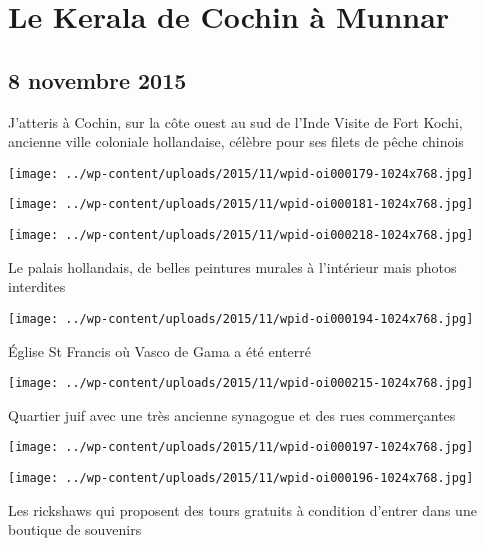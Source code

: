 \chapter{Le Kerala de Cochin à Munnar}
\section*{8 novembre 2015}
J'atteris à Cochin, sur la côte ouest au sud de l'Inde \newline
 Visite de Fort Kochi, ancienne ville coloniale hollandaise, célèbre pour ses filets de pêche chinois \newline
 \newline
\centerline{\texttt{[image: ../wp-content/uploads/2015/11/wpid-oi000179-1024x768.jpg]} } 
 \newline
 \newline
\centerline{\texttt{[image: ../wp-content/uploads/2015/11/wpid-oi000181-1024x768.jpg]} } 
 \newline
 \newline
\centerline{\texttt{[image: ../wp-content/uploads/2015/11/wpid-oi000218-1024x768.jpg]} } 
 \newline
 Le palais hollandais, de belles peintures murales à l'intérieur mais photos interdites \newline
 \newline
\centerline{\texttt{[image: ../wp-content/uploads/2015/11/wpid-oi000194-1024x768.jpg]} } 
 \newline
 Église St Francis où Vasco de Gama a été enterré \newline
 \newline
\centerline{\texttt{[image: ../wp-content/uploads/2015/11/wpid-oi000215-1024x768.jpg]} } 
 \newline
 Quartier juif avec une très ancienne synagogue et des rues commerçantes \newline
 \newline
\centerline{\texttt{[image: ../wp-content/uploads/2015/11/wpid-oi000197-1024x768.jpg]} } 
 \newline
 \newline
\centerline{\texttt{[image: ../wp-content/uploads/2015/11/wpid-oi000196-1024x768.jpg]} } 
 \newline
 Les rickshaws qui proposent des tours gratuits à condition d'entrer dans une boutique de souvenirs \newline
 \newline
